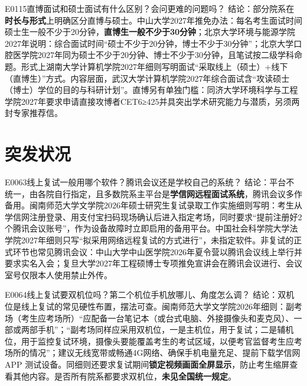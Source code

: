 \begin{qa}{E0115}{直博面试和硕士面试有什么区别？会问更难的问题吗？}
结论：部分院系在\textbf{时长与形式}上明确区分直博与硕士。中山大学2027年推免办法：每名考生面试时间硕士生一般不少于20分钟，\textbf{直博生一般不少于30分钟}；北京大学环境与能源学院2027年说明：综合面试时间“硕士不少于20分钟，博士不少于30分钟”；北京大学口腔医学院2027年同为硕士不少于20分钟、博士不少于30分钟，且笔试按二级学科命题。形式上湖南大学计算机学院2027年细则写明面试“采取线上（硕士）+线下（直博生）”方式。内容层面，武汉大学计算机学院2027年综合面试含“攻读硕士（博士）学位的目的与科研计划”。直博另有单独门槛：同济大学环境科学与工程学院2027年要求申请直接攻博者CET6≥425并具突出学术研究能力与潜质，另须两封专家推荐信。
\end{qa}

\section{突发状况}
\begin{qa}{E0063}{线上复试一般用哪个软件？腾讯会议还是学校自己的系统？}
结论：平台不统一，由各院自行指定，且多数院系主平台是\textbf{学信网远程面试系统}，腾讯会议多作备用。闽南师范大学文学院2026年硕士研究生复试录取工作实施细则写明：考生从学信网注册登录、用支付宝扫码现场确认后进入指定考场，同时要求“提前注册好2个腾讯会议账号”，作为设备故障时立即启用的备用平台。中国社会科学院大学法学院2027年细则只写“拟采用网络远程复试的方式进行”，未指定软件。非复试的正式环节也常见腾讯会议：中山大学中山医学院2026年夏令营以腾讯会议线上举行并要求实名入会；复旦大学2027年工程硕博士专项推免宣讲会在腾讯会议进行、会议室号仅限本人使用禁止外传。
\end{qa}

\begin{qa}{E0064}{线上复试要双机位吗？第二个机位手机放哪儿、角度怎么调？}
结论：双机位是线上复试的常见硬性布置，摆法可查。闽南师范大学文学院2026年细则：副考场（考生应考场所）“应配备一台笔记本（或台式电脑、外接摄像头和麦克风）、一部或两部手机”；“副考场同样应采用双机位，一是主机位，用于复试；二是辅机位，用于监控复试环境，摄像头要能覆盖考生的考试区域，以便考官监督考生应考场所的情况”；建议无线宽带或畅通4G网络、确保手机电量充足、提前下载学信网 APP 测试设备。同细则还要求复试期间\textbf{锁定视频画面全屏显示}，防止考生缩屏查看其他内容。是否所有院系都要求双机位，\textbf{未见全国统一规定}。
\end{qa}


